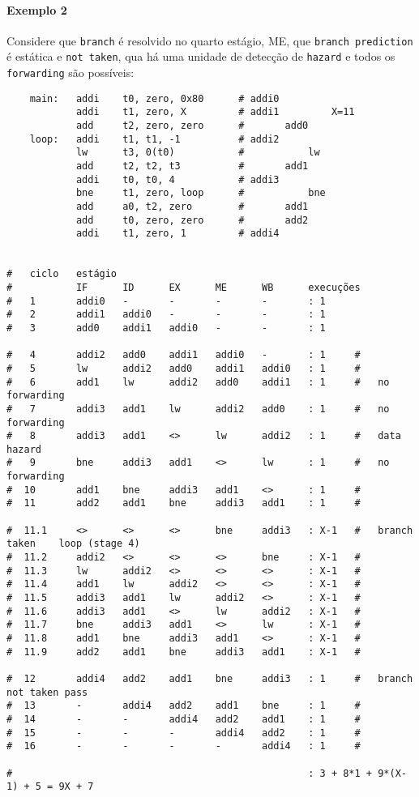 \documentclass{article}
\begin{document}
\paragraph{Exemplo 2}Considere que \texttt{branch} é resolvido no quarto estágio, ME, que \texttt{branch prediction} é estática e \texttt{not taken}, qua há uma unidade de detecção de \texttt{hazard} e todos os \texttt{forwarding} são possíveis:
\begin{scriptsize}
    \myStyleRISCV
    \begin{lstlisting}
    main:   addi    t0, zero, 0x80      # addi0
            addi    t1, zero, X         # addi1         X=11
            add     t2, zero, zero      #       add0
    loop:   addi    t1, t1, -1          # addi2
            lw      t3, 0(t0)           #           lw
            add     t2, t2, t3          #       add1
            addi    t0, t0, 4           # addi3
            bne     t1, zero, loop      #           bne
            add     a0, t2, zero        #       add1
            add     t0, zero, zero      #       add2
            addi    t1, zero, 1         # addi4


#   ciclo   estágio
#           IF      ID      EX      ME      WB      execuções
#   1       addi0   -       -       -       -       : 1
#   2       addi1   addi0   -       -       -       : 1
#   3       add0    addi1   addi0   -       -       : 1

#   4       addi2   add0    addi1   addi0   -       : 1     #
#   5       lw      addi2   add0    addi1   addi0   : 1     #
#   6       add1    lw      addi2   add0    addi1   : 1     #   no forwarding
#   7       addi3   add1    lw      addi2   add0    : 1     #   no forwarding
#   8       addi3   add1    <>      lw      addi2   : 1     #   data hazard
#   9       bne     addi3   add1    <>      lw      : 1     #   no forwarding
#  10       add1    bne     addi3   add1    <>      : 1     #
#  11       add2    add1    bne     addi3   add1    : 1     #

#  11.1     <>      <>      <>      bne     addi3   : X-1   #   branch taken    loop (stage 4)
#  11.2     addi2   <>      <>      <>      bne     : X-1   #
#  11.3     lw      addi2   <>      <>      <>      : X-1   #
#  11.4     add1    lw      addi2   <>      <>      : X-1   #
#  11.5     addi3   add1    lw      addi2   <>      : X-1   #
#  11.6     addi3   add1    <>      lw      addi2   : X-1   #
#  11.7     bne     addi3   add1    <>      lw      : X-1   #
#  11.8     add1    bne     addi3   add1    <>      : X-1   #
#  11.9     add2    add1    bne     addi3   add1    : X-1   #

#  12       addi4   add2    add1    bne     addi3   : 1     #   branch not taken pass
#  13       -       addi4   add2    add1    bne     : 1     #
#  14       -       -       addi4   add2    add1    : 1     #
#  15       -       -       -       addi4   add2    : 1     #
#  16       -       -       -       -       addi4   : 1     #

#                                                   : 3 + 8*1 + 9*(X-1) + 5 = 9X + 7
    \end{lstlisting}
\end{scriptsize}
\end{document}

